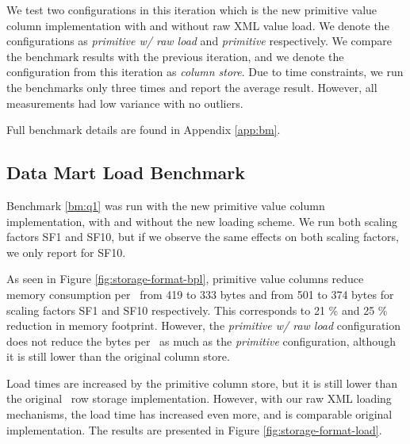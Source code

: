 We test two configurations in this iteration which is the new primitive value column implementation with and without raw XML value load. We denote the configurations as \textit{primitive w/ raw load} and \textit{primitive} respectively. We compare the benchmark results with the previous iteration, and we denote the configuration from this iteration as \textit{column store}. Due to time constraints, we run the benchmarks only three times and report the average result. However, all measurements had low variance with no outliers.

Full benchmark details are found in Appendix \ref{app:bm}.

\subsection{Data Mart Load Benchmark}
\label{storage-format:q1}

Benchmark \ref{bm:q1} was run with the new primitive value column implementation, with and without the new loading scheme. We run both scaling factors SF1 and SF10, but if we observe the same effects on both scaling factors, we only report for SF10.

As seen in Figure \ref{fig:storage-format-bpl}, primitive value columns reduce memory consumption per \lineitem~from 419 to 333 bytes and from 501 to 374 bytes for scaling factors SF1 and SF10 respectively. This corresponds to 21 \% and 25 \% reduction in memory footprint. However, the \textit{primitive w/ raw load} configuration does not reduce the bytes per \lineitem~as much as the \textit{primitive} configuration, although it is still lower than the original column store.


Load times are increased by the primitive column store, but it is still lower than the original \gap~row storage implementation. However, with our raw XML loading mechanisms, the load time has increased even more, and is comparable original implementation. The results are presented in Figure \ref{fig:storage-format-load}. 

